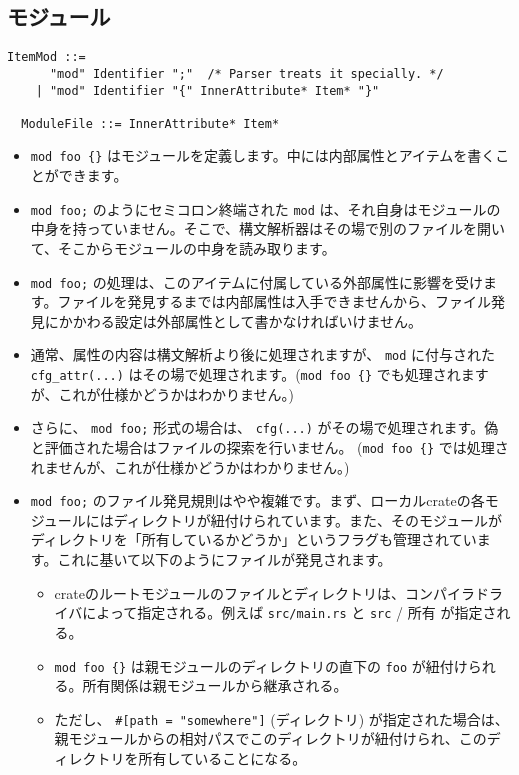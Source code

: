 \documentclass[dvipdfmx,uplatex,papersize,a4paper,10pt]{jsbook}
\theoremstyle{definition}
\begin{document}
\subsection{モジュール}

\begin{lstlisting}[language=BNFLike, gobble=2]
  ItemMod ::=
      "mod" Identifier ";"  /* Parser treats it specially. */
    | "mod" Identifier "{" InnerAttribute* Item* "}"

  ModuleFile ::= InnerAttribute* Item*
\end{lstlisting}

\begin{itemize}
  \item \verb|mod foo {}| はモジュールを定義します。中には内部属性とアイテムを書くことができます。
  \item \verb|mod foo;| のようにセミコロン終端された \verb|mod| は、それ自身はモジュールの中身を持っていません。そこで、構文解析器はその場で別のファイルを開いて、そこからモジュールの中身を読み取ります。
  \item \verb|mod foo;| の処理は、このアイテムに付属している外部属性に影響を受けます。ファイルを発見するまでは内部属性は入手できませんから、ファイル発見にかかわる設定は外部属性として書かなければいけません。
  \item 通常、属性の内容は構文解析より後に処理されますが、 \verb|mod| に付与された \verb|cfg_attr(...)| はその場で処理されます。(\verb|mod foo {}| でも処理されますが、これが仕様かどうかはわかりません。)
  \item さらに、 \verb|mod foo;| 形式の場合は、 \verb|cfg(...)| がその場で処理されます。偽と評価された場合はファイルの探索を行いません。 (\verb|mod foo {}| では処理されませんが、これが仕様かどうかはわかりません。)
  \item \verb|mod foo;| のファイル発見規則はやや複雑です。まず、ローカルcrateの各モジュールにはディレクトリが紐付けられています。また、そのモジュールがディレクトリを「所有しているかどうか」というフラグも管理されています。これに基いて以下のようにファイルが発見されます。
    \begin{itemize}
      \item crateのルートモジュールのファイルとディレクトリは、コンパイラドライバによって指定される。例えば \verb|src/main.rs| と \verb|src| / 所有 が指定される。
      \item \verb|mod foo {}| は親モジュールのディレクトリの直下の \verb|foo| が紐付けられる。所有関係は親モジュールから継承される。
      \item ただし、 \verb|#[path = "somewhere"]| (ディレクトリ) が指定された場合は、親モジュールからの相対パスでこのディレクトリが紐付けられ、このディレクトリを所有していることになる。

\end{itemize}
\end{itemize}
\end{document}
